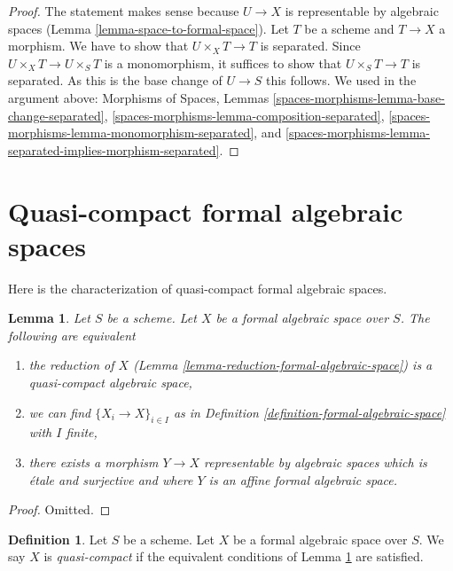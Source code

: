 \documentclass{stacks-project}
\theoremstyle{plain}
\newtheorem{lemma}[subsection]{Lemma}
\theoremstyle{definition}
\newtheorem{definition}[subsection]{Definition}
\theoremstyle{remark}
\numberwithin{equation}{subsection}
\begin{document}
\begin{proof}
The statement makes sense because $U \to X$ is representable by
algebraic spaces (Lemma \ref{lemma-space-to-formal-space}).
Let $T$ be a scheme and $T \to X$ a morphism. We have to show
that $U \times_X T \to T$ is separated. Since $U \times_X T \to U \times_S T$
is a monomorphism, it suffices to show that $U \times_S T \to T$
is separated. As this is the base change of $U \to S$ this
follows. We used in the argument above:
Morphisms of Spaces, Lemmas
\ref{spaces-morphisms-lemma-base-change-separated},
\ref{spaces-morphisms-lemma-composition-separated},
\ref{spaces-morphisms-lemma-monomorphism-separated}, and
\ref{spaces-morphisms-lemma-separated-implies-morphism-separated}.
\end{proof}




\section{Quasi-compact formal algebraic spaces}
\label{section-quasi-compact}

\noindent
Here is the characterization of quasi-compact formal algebraic
spaces.

\begin{lemma}
\label{lemma-characterize-quasi-compact}
Let $S$ be a scheme. Let $X$ be a formal algebraic space over $S$.
The following are equivalent
\begin{enumerate}
\item the reduction of $X$
(Lemma \ref{lemma-reduction-formal-algebraic-space}) is a quasi-compact
algebraic space,
\item we can find $\{X_i \to X\}_{i \in I}$ as in
Definition \ref{definition-formal-algebraic-space} with $I$ finite,
\item there exists a morphism $Y \to X$ representable by algebraic
spaces which is \'etale and surjective and where
$Y$ is an affine formal algebraic space.
\end{enumerate}
\end{lemma}

\begin{proof}
Omitted.
\end{proof}

\begin{definition}
\label{definition-quasi-compact}
Let $S$ be a scheme. Let $X$ be a formal algebraic space over $S$.
We say $X$ is {\it quasi-compact} if the equivalent conditions of
Lemma \ref{lemma-characterize-quasi-compact} are satisfied.
\end{definition}
\end{document}
